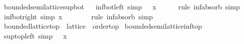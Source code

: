 \begin{isabellebody}
\isanewline
\isanewline
{}\isamarkupfalse%
\ bounded{\isacharunderscore}{\kern0pt}semilattice{\isacharunderscore}{\kern0pt}sup{\isacharunderscore}{\kern0pt}bot%
\isadelimproof
\ %
\endisadelimproof
%
\isatagproof
\isacommand{{\isachardot}{\kern0pt}{\isachardot}{\kern0pt}}\isamarkupfalse%
%
\endisatagproof
{\isafoldproof}%
%
\isadelimproof
%
\endisadelimproof
\isanewline
\isanewline
{}\isamarkupfalse%
\ inf{\isacharunderscore}{\kern0pt}bot{\isacharunderscore}{\kern0pt}left\ {\isacharbrackleft}{\kern0pt}simp{\isacharbrackright}{\kern0pt}{\isacharcolon}{\kern0pt}\ {\isachardoublequoteopen}{\isasymbottom}\ {\isasymsqinter}\ x\ {\isacharequal}{\kern0pt}\ {\isasymbottom}{\isachardoublequoteclose}\isanewline
%
\isadelimproof
\ \ %
\endisadelimproof
%
\isatagproof
{}\isamarkupfalse%
\ {\isacharparenleft}{\kern0pt}rule\ inf{\isacharunderscore}{\kern0pt}absorb{}{\isacharparenright}{\kern0pt}\ simp%
\endisatagproof
{\isafoldproof}%
%
\isadelimproof
\isanewline
%
\endisadelimproof
\isanewline
{}\isamarkupfalse%
\ inf{\isacharunderscore}{\kern0pt}bot{\isacharunderscore}{\kern0pt}right\ {\isacharbrackleft}{\kern0pt}simp{\isacharbrackright}{\kern0pt}{\isacharcolon}{\kern0pt}\ {\isachardoublequoteopen}x\ {\isasymsqinter}\ {\isasymbottom}\ {\isacharequal}{\kern0pt}\ {\isasymbottom}{\isachardoublequoteclose}\isanewline
%
\isadelimproof
\ \ %
\endisadelimproof
%
\isatagproof
{}\isamarkupfalse%
\ {\isacharparenleft}{\kern0pt}rule\ inf{\isacharunderscore}{\kern0pt}absorb{}{\isacharparenright}{\kern0pt}\ simp%
\endisatagproof
{\isafoldproof}%
%
\isadelimproof
\isanewline
%
\endisadelimproof
\isanewline
{}\isamarkupfalse%
\isanewline
\isanewline
{}\isamarkupfalse%
\ bounded{\isacharunderscore}{\kern0pt}lattice{\isacharunderscore}{\kern0pt}top\ {\isacharequal}{\kern0pt}\ lattice\ {\isacharplus}{\kern0pt}\ order{\isacharunderscore}{\kern0pt}top\isanewline
{}\isanewline
\isanewline
{}\isamarkupfalse%
\ bounded{\isacharunderscore}{\kern0pt}semilattice{\isacharunderscore}{\kern0pt}inf{\isacharunderscore}{\kern0pt}top%
\isadelimproof
\ %
\endisadelimproof
%
\isatagproof
\isacommand{{\isachardot}{\kern0pt}{\isachardot}{\kern0pt}}\isamarkupfalse%
%
\endisatagproof
{\isafoldproof}%
%
\isadelimproof
%
\endisadelimproof
\isanewline
\isanewline
{}\isamarkupfalse%
\ sup{\isacharunderscore}{\kern0pt}top{\isacharunderscore}{\kern0pt}left\ {\isacharbrackleft}{\kern0pt}simp{\isacharbrackright}{\kern0pt}{\isacharcolon}{\kern0pt}\ {\isachardoublequoteopen}{\isasymtop}\ {\isasymsqunion}\ x\ {\isacharequal}{\kern0pt}\ {\isasymtop}{\isachardoublequoteclose}\isanewline

\end{isabellebody}
